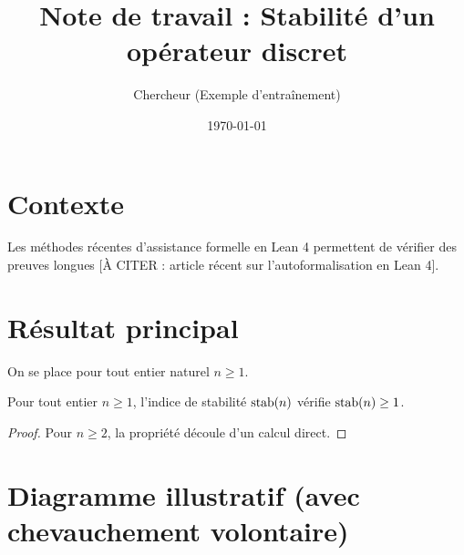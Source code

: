 \documentclass[11pt,a4paper]{article}
\title{Note de travail : Stabilité d'un opérateur discret}
\author{Chercheur (Exemple d'entraînement)}
\date{\today}
\begin{document}
\maketitle

\section{Contexte}
Les méthodes récentes d'assistance formelle en Lean 4 permettent de vérifier des preuves longues [À CITER : article récent sur l'autoformalisation en Lean 4].

\section{Résultat principal}
\begin{definition}
On se place pour tout entier naturel $n \ge 1$.
\end{definition}

\begin{lemma}
Pour tout entier $n \ge 1$, l'indice de stabilité $\mathrm{stab}(n)$ vérifie $\mathrm{stab}(n) \ge 1$.
\end{lemma}

\begin{proof}
Pour $n \ge 2$, la propriété découle d'un calcul direct.
\end{proof}

\section{Diagramme illustratif (avec chevauchement volontaire)}
\begin{center}
\end{center}



\end{document}
